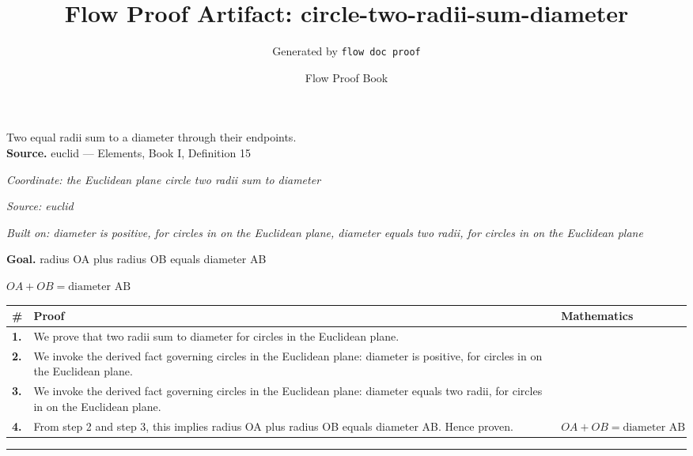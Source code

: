 \documentclass[11pt]{article}
\title{Flow Proof Artifact: circle-two-radii-sum-diameter}
\author{Generated by \texttt{flow doc proof}}
\date{Flow Proof Book}
\theoremstyle{definition}
\begin{document}
\maketitle
Two equal radii sum to a diameter through their endpoints.\\[0.5em]
\textbf{Source.} euclid — Elements, Book I, Definition 15\\[0.5em]
\bigskip
{}\par
\smallskip\noindent\textit{Coordinate: the Euclidean plane \cdot circle \cdot two radii sum to diameter}\par
\smallskip\noindent\textit{Source: euclid}\par
\smallskip\noindent\textit{Built on: diameter is positive, for circles in on the Euclidean plane, diameter equals two radii, for circles in on the Euclidean plane}\par
\medskip
\noindent\textbf{Goal.} radius OA plus radius OB equals diameter AB\par
\noindent$\displaystyle OA + OB = \text{diameter AB}$\par
\medskip
\noindent
\begin{tabular}{@{} >{\raggedright\arraybackslash}p{} >{\raggedright\arraybackslash}p{} >{\raggedleft\arraybackslash}p{} @{}}
\textbf{\#} & \textbf{Proof} & \textbf{Mathematics} \\
\midrule
\textbf{1.} & We prove that two radii sum to diameter for circles in the Euclidean plane. & \\[0.45em]
\textbf{2.} & We invoke the derived fact governing circles in the Euclidean plane: diameter is positive, for circles in on the Euclidean plane. & \\[0.45em]
\textbf{3.} & We invoke the derived fact governing circles in the Euclidean plane: diameter equals two radii, for circles in on the Euclidean plane. & \\[0.45em]
\textbf{4.} & From step 2 and step 3, this implies radius OA plus radius OB equals diameter AB. Hence proven. & $\displaystyle OA + OB = \text{diameter AB}$ \\[0.45em]
\bottomrule
\end{tabular}
\label{thm:Geometry-circle-two_radii_sum_to_diameter}
\par\medskip\hrule
\end{document}
